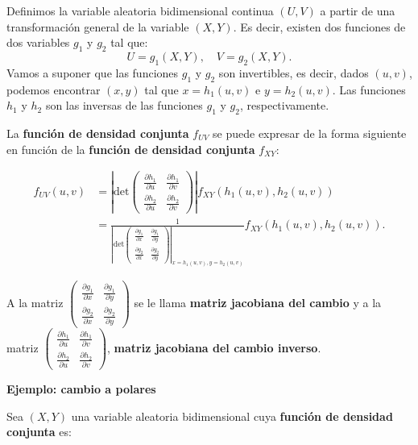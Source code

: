 \documentclass[]{book}
\begin{document}
Definimos la variable aleatoria bidimensional continua \((U,V)\) a partir de una transformación general de la variable \((X,Y)\). Es decir, existen dos funciones de dos variables \(g_1\) y \(g_2\) tal que:
\[
U  = g_1 (X,Y),\quad 
V  = g_2 (X,Y).
\]
Vamos a suponer que las funciones \(g_1\) y \(g_2\) son invertibles, es decir, dados \((u,v)\), podemos encontrar \((x,y)\) tal que \(x=h_1(u,v)\) e \(y=h_2(u,v)\). Las funciones \(h_1\) y \(h_2\) son las inversas de las funciones \(g_1\) y \(g_2\), respectivamente.

La \textbf{función de densidad conjunta} \(f_{UV}\) se puede expresar de la forma siguiente en función de la \textbf{función de densidad conjunta} \(f_{XY}\):

\[
\begin{array}{rl}
f_{UV}(u,v) & =\left|\mathrm{det}\begin{pmatrix}\frac{\partial h_1}{\partial u} & \frac{\partial h_1}{\partial v}\\ \frac{\partial h_2}{\partial u} & \frac{\partial h_2}{\partial v}\end{pmatrix}\right|f_{XY}(h_1(u,v),h_2(u,v))\\ & =\frac{1}{\left|\mathrm{det}\begin{pmatrix}\frac{\partial g_1}{\partial x} & \frac{\partial g_1}{\partial y}\\ \frac{\partial g_2}{\partial x} & \frac{\partial g_2}{\partial y}\end{pmatrix}\right|_{x=h_1(u,v),y=h_2(u,v)}}f_{XY}(h_1(u,v),h_2(u,v)).
\end{array}
\]

A la matriz \(\begin{pmatrix}\frac{\partial g_1}{\partial x} & \frac{\partial g_1}{\partial y}\\ \frac{\partial g_2}{\partial x} & \frac{\partial g_2}{\partial y}\end{pmatrix}\) se le llama \textbf{matriz jacobiana del cambio} y a la matriz \(\begin{pmatrix}\frac{\partial h_1}{\partial u} & \frac{\partial h_1}{\partial v}\\ \frac{\partial h_2}{\partial u} & \frac{\partial h_2}{\partial v}\end{pmatrix}\), \textbf{matriz jacobiana del cambio inverso}.

\textbf{Ejemplo: cambio a polares}

Sea \((X,Y)\) una variable aleatoria bidimensional cuya \textbf{función de densidad conjunta} es:
\end{document}
